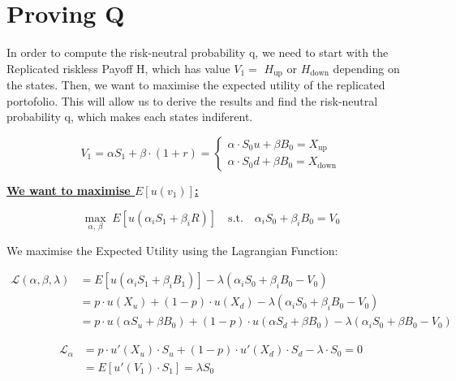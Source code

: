 \documentclass[12pt]{article}
\begin{document}
\section{Proving Q}

\noindent In order to compute the risk-neutral probability q, we need to start with the Replicated riskless Payoff H, which has value $V_1 =$ $H_{\text{up}}$ or $H_{\text{down}}$ depending on the states. Then, we want to maximise the expected utility of the replicated portofolio. This will allow us to derive the results and find the risk-neutral probability q, which makes each states indiferent.

\begin{center}
\begin{equation*}
V_1 = \alpha S_1 + \beta \cdot (1+r) =
\left\{
\begin{array}{ll}
\alpha \cdot S_0 u + \beta B_0 = X_{\text{up}} \\[4pt]
\alpha \cdot S_0 d + \beta B_0 = X_{\text{down}}
\end{array}
\right.
\end{equation*}
\end{center}
\vspace{1em}

\noindent\textbf{\uline{We want to maximise $E[u(v_1)]$:}}

\vspace{0.5em}

\[
\max_{\alpha,\, \beta} \; E\!\left[u\!\left(\alpha_i S_1 + \beta_i R\right)\right]
\quad \text{s.t.} \quad
\alpha_i S_0 + \beta_i B_0 = V_0
\]
\vspace{0.2em}

\noindent We maximise the Expected Utility using the Lagrangian Function:

\begin{align*}
\mathcal{L}(\alpha, \beta, \lambda)
  &= E\!\left[u\!\left(\alpha_i S_1 + \beta_i B_1\right)\right]
     - \lambda\!\left(\alpha_i S_0 + \beta_i B_0 - V_0\right) \\[6pt]
  &= p \cdot u(X_u) + (1-p) \cdot u(X_d)
     - \lambda\!\left(\alpha_i S_0 + \beta_i B_0 - V_0\right) \\[6pt]
  &= p \cdot u(\alpha S_{u} + \beta B_0)
     + (1-p) \cdot u(\alpha S_d + \beta B_0)
     - \lambda\!\left(\alpha_i S_0 + \beta B_0 - V_0\right)
\end{align*}

\vspace{1.5em}

\begin{align*}
\mathcal{L}_\alpha
  &= p \cdot u'(X_u) \cdot S_u + (1-p) \cdot u'(X_d) \cdot S_d
     - \lambda \cdot S_0 = 0
  \tag{I} \\[4pt]
  &= E\!\left[u'(V_1) \cdot S_1\right] = \lambda S_0
\end{align*}
\end{document}
